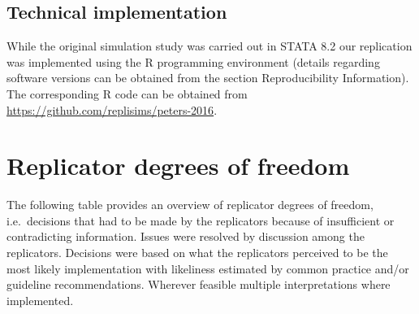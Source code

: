 \documentclass[
  english,
  doc,floatsintext,draftall]{apa6}
\begin{document}
\hypertarget{technical-implementation}{%
\subsection{Technical implementation}\label{technical-implementation}}

While the original simulation study was carried out in STATA 8.2 our replication was implemented
using the R programming environment (details regarding software versions can be obtained from the section Reproducibility Information).
The corresponding R code can be obtained from \url{https://github.com/replisims/peters-2016}.

\hypertarget{replicator-degrees-of-freedom}{%
\section{Replicator degrees of freedom}\label{replicator-degrees-of-freedom}}

The following table provides an overview of replicator degrees of freedom,
i.e.~decisions that had to be made by the replicators because of insufficient or contradicting information.
Issues were resolved by discussion among the replicators.
Decisions were based on what the replicators perceived to be the most likely implementation with likeliness estimated by common practice and/or guideline recommendations.
Wherever feasible multiple interpretations where implemented.
\end{document}
